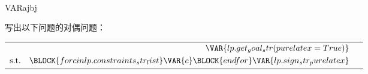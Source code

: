 
\\VAR{ajbj}{写出以下问题的对偶问题：

\begin{tabular}{C{.4\textwidth}C{.4\textwidth}}
\vbox{
$\begin{alignedat}{20}
\VAR{lp.get_goal_str(purelatex=True)}\\
\text{s.t.}\quad
\BLOCK{ for c in lp.constraints_str_list }
\VAR{c}
\BLOCK{ endfor }
\VAR{lp.sign_str_purelatex}
\end{alignedat}$}
&
\vbox{}\\ 
\end{tabular}
}%

